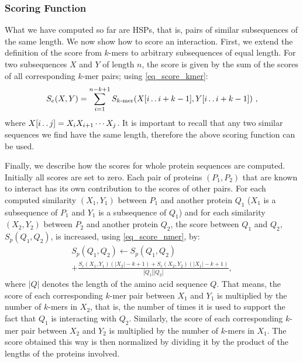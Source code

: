 \subsubsection{Scoring Function}
What we have computed so far are HSPs, that is, pairs of similar subsequences of the same length. We now show how to score an interaction. First, we extend the definition of the score from $k$-mers to arbitrary subsequences of equal length. For two subsequences $X$ and $Y$ of length $n$, the score is given by the sum of the scores of all corresponding $k$-mer pairs; using \eqref{eq_score_kmer}:
\begin{equation}\label{eq_score_nmer}
S_e(X,Y) = \sum_{i=1}^{n-k+1}S_\textrm{$k$-mer}(X[i\mathinner{\ldotp\ldotp} i+k-1],Y[i\mathinner{\ldotp\ldotp} i+k-1])\ ,
\end{equation}
where $X[i\mathinner{\ldotp\ldotp} j] = X_iX_{i+1}\cdots X_j$. It is important to recall that any two similar sequences we find have the same length, therefore the above scoring function can be used.

Finally, we describe how the scores for whole protein sequences are computed. Initially all scores are set to zero. Each pair of proteins $(P_1, P_2)$ that are known to interact has its own contribution to the scores of other pairs. For each computed similarity $(X_1,Y_1)$ between $P_1$ and another protein $Q_1$ ($X_1$ is a subsequence of $P_1$ and $Y_1$ is a subsequence of $Q_1$) and for each similarity $(X_2,Y_2)$ between $P_2$ and another protein $Q_2$, the score between $Q_1$ and $Q_2$, $S_p(Q_1,Q_2)$, is increased, using \eqref{eq_score_nmer}, by:
\begin{equation}\label{eq_score_add}
\begin{array}{l}
S_p(Q_1,Q_2)\gets S_p(Q_1,Q_2)\\

 + \displaystyle{\frac{S_e(X_1,Y_1)(|X_2|-k+1)+ S_e(X_2,Y_2)(|X_1|-k+1)}{|Q_1||Q_2|}},
 \end{array}
\end{equation}
where $|Q|$ denotes the length of the amino acid sequence $Q$. That means, the score of each corresponding $k$-mer pair between $X_1$ and $Y_1$ is multiplied by the number of $k$-mers in $X_2$, that is, the number of times it is used to support the fact that $Q_1$ is interacting with $Q_2$. Similarly, the score of each corresponding $k$-mer pair between $X_2$ and $Y_2$ is multiplied by the number of $k$-mers in $X_1$. The score obtained this way is then normalized by dividing it by the product of the lengths of the proteins involved. 

